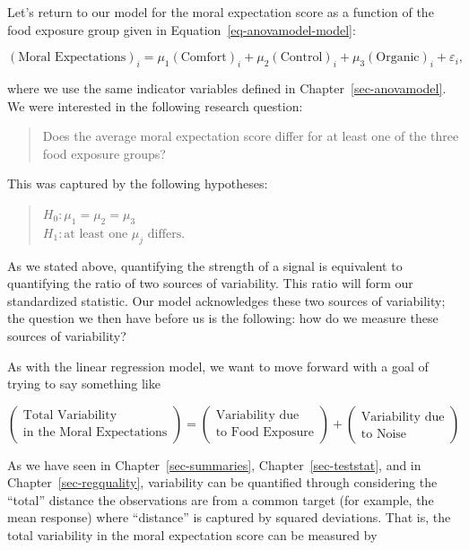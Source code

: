 \documentclass[
  letterpaper,
  DIV=11,
  numbers=noendperiod]{scrreprt}
\theoremstyle{plain}
\theoremstyle{definition}
\theoremstyle{definition}
\theoremstyle{remark}
\begin{document}
Let's return to our model for the moral expectation score as a function
of the food exposure group given in Equation~\ref{eq-anovamodel-model}:

\[(\text{Moral Expectations})_i = \mu_1 (\text{Comfort})_i + \mu_2 (\text{Control})_i + \mu_3 (\text{Organic})_i + \varepsilon_i,\]

where we use the same indicator variables defined in
Chapter~\ref{sec-anovamodel}. We were interested in the following
research question:

\begin{quote}
Does the average moral expectation score differ for at least one of the
three food exposure groups?
\end{quote}

This was captured by the following hypotheses:

\begin{quote}
\(H_0: \mu_1 = \mu_2 = \mu_3\)\\
\(H_1: \text{at least one } \mu_j \text{ differs}.\)
\end{quote}

As we stated above, quantifying the strength of a signal is equivalent
to quantifying the ratio of two sources of variability. This ratio will
form our standardized statistic. Our model acknowledges these two
sources of variability; the question we then have before us is the
following: how do we measure these sources of variability?

As with the linear regression model, we want to move forward with a goal
of trying to say something like

\[\begin{pmatrix} \text{Total Variability} \\ \text{in the Moral Expectations} \end{pmatrix} = \begin{pmatrix} \text{Variability due} \\ \text{to Food Exposure} \end{pmatrix} + \begin{pmatrix} \text{Variability due} \\ \text{to Noise} \end{pmatrix}\]

As we have seen in Chapter~\ref{sec-summaries},
Chapter~\ref{sec-teststat}, and in Chapter~\ref{sec-regquality},
variability can be quantified through considering the ``total'' distance
the observations are from a common target (for example, the mean
response) where ``distance'' is captured by squared deviations. That is,
the total variability in the moral expectation score can be measured by
\end{document}

